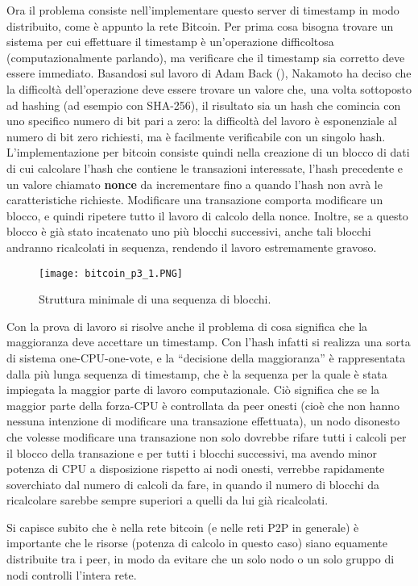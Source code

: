 Ora il problema consiste nell'implementare questo server di timestamp in
modo distribuito, come è appunto la rete Bitcoin. Per prima cosa bisogna
trovare un sistema per cui effettuare il timestamp è un'operazione
difficoltosa (computazionalmente parlando), ma verificare che il
timestamp sia corretto deve essere immediato. Basandosi sul lavoro di
Adam Back (\cite{hashcash}), Nakamoto ha deciso che la difficoltà
dell'operazione deve essere trovare un valore che, una volta sottoposto
ad hashing (ad esempio con SHA-256), il risultato sia un hash che
comincia con uno specifico numero di bit pari a zero: la difficoltà del
lavoro è esponenziale al numero di bit zero richiesti, ma è facilmente
verificabile con un singolo hash. L'implementazione per bitcoin consiste
quindi nella creazione di un blocco di dati di cui calcolare l'hash che
contiene le transazioni interessate, l'hash precedente e un valore
chiamato \textbf{nonce} da incrementare fino a quando l'hash non avrà le
caratteristiche richieste. Modificare una transazione comporta
modificare un blocco, e quindi ripetere tutto il lavoro di calcolo della
nonce. Inoltre, se a questo blocco è già stato incatenato uno più
blocchi successivi, anche tali blocchi andranno ricalcolati in sequenza,
rendendo il lavoro estremamente gravoso.

\begin{figure}[htbp]
\centering
\texttt{[image: bitcoin\_p3\_1.PNG]}
\caption{Struttura minimale di una sequenza di
blocchi.\label{bitcoin_p3_1}}
\end{figure}

Con la prova di lavoro si risolve anche il problema di cosa significa
che la maggioranza deve accettare un timestamp. Con l'hash infatti si
realizza una sorta di sistema one-CPU-one-vote, e la ``decisione della
maggioranza'' è rappresentata dalla più lunga sequenza di timestamp, che
è la sequenza per la quale è stata impiegata la maggior parte di lavoro
computazionale. Ciò significa che se la maggior parte della forza-CPU è
controllata da peer onesti (cioè che non hanno nessuna intenzione di
modificare una transazione effettuata), un nodo disonesto che volesse
modificare una transazione non solo dovrebbe rifare tutti i calcoli per
il blocco della transazione e per tutti i blocchi successivi, ma avendo
minor potenza di CPU a disposizione rispetto ai nodi onesti, verrebbe
rapidamente soverchiato dal numero di calcoli da fare, in quando il
numero di blocchi da ricalcolare sarebbe sempre superiori a quelli da
lui già ricalcolati.

Si capisce subito che è nella rete bitcoin (e nelle reti P2P in
generale) è importante che le risorse (potenza di calcolo in questo
caso) siano equamente distribuite tra i peer, in modo da evitare che un
solo nodo o un solo gruppo di nodi controlli l'intera rete.

